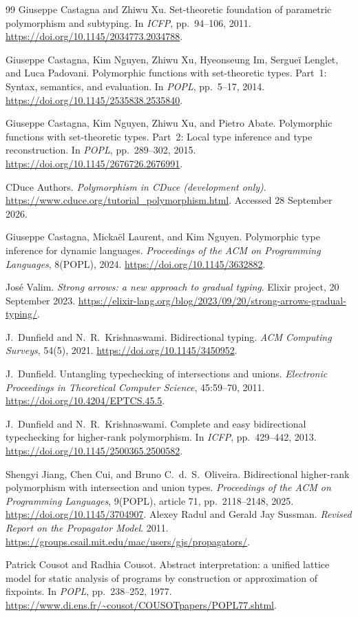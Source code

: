 \documentclass[10pt,a4paper]{article}
\theoremstyle{remark}
\begin{document}
\begin{thebibliography}{99}
Giuseppe Castagna and Zhiwu Xu.
Set-theoretic foundation of parametric polymorphism and subtyping.
In \emph{ICFP}, pp.~94--106, 2011.
\url{https://doi.org/10.1145/2034773.2034788}.

Giuseppe Castagna, Kim Nguyen, Zhiwu Xu, Hyeonseung Im, Sergue\"i Lenglet,
and Luca Padovani.
Polymorphic functions with set-theoretic types. Part~1: Syntax, semantics,
and evaluation. In \emph{POPL}, pp.~5--17, 2014.
\url{https://doi.org/10.1145/2535838.2535840}.

Giuseppe Castagna, Kim Nguyen, Zhiwu Xu, and Pietro Abate.
Polymorphic functions with set-theoretic types. Part~2: Local type inference
and type reconstruction. In \emph{POPL}, pp.~289--302, 2015.
\url{https://doi.org/10.1145/2676726.2676991}.

CDuce Authors. \emph{Polymorphism in CDuce (development only)}.
\url{https://www.cduce.org/tutorial_polymorphism.html}.
Accessed 28 September 2026.

Giuseppe Castagna, Micka\"el Laurent, and Kim Nguyen.
Polymorphic type inference for dynamic languages.
\emph{Proceedings of the ACM on Programming Languages}, 8(POPL), 2024.
\url{https://doi.org/10.1145/3632882}.

Jos\'e Valim. \emph{Strong arrows: a new approach to gradual typing}.
Elixir project, 20 September 2023.
\url{https://elixir-lang.org/blog/2023/09/20/strong-arrows-gradual-typing/}.

J.~Dunfield and N.~R.~Krishnaswami. Bidirectional typing.
\emph{ACM Computing Surveys}, 54(5), 2021.
\url{https://doi.org/10.1145/3450952}.

J.~Dunfield. Untangling typechecking of intersections and unions.
\emph{Electronic Proceedings in Theoretical Computer Science}, 45:59--70, 2011.
\url{https://doi.org/10.4204/EPTCS.45.5}.

J.~Dunfield and N.~R.~Krishnaswami.
Complete and easy bidirectional typechecking for higher-rank polymorphism.
In \emph{ICFP}, pp.~429--442, 2013.
\url{https://doi.org/10.1145/2500365.2500582}.

Shengyi Jiang, Chen Cui, and Bruno C.~d.~S.~Oliveira.
Bidirectional higher-rank polymorphism with intersection and union types.
\emph{Proceedings of the ACM on Programming Languages}, 9(POPL),
article 71, pp.~2118--2148, 2025.
\url{https://doi.org/10.1145/3704907}.
Alexey Radul and Gerald Jay Sussman.
\emph{Revised Report on the Propagator Model}. 2011.
\url{https://groups.csail.mit.edu/mac/users/gjs/propagators/}.

Patrick Cousot and Radhia Cousot.
Abstract interpretation: a unified lattice model for static analysis of programs
by construction or approximation of fixpoints.
In \emph{POPL}, pp.~238--252, 1977.
\url{https://www.di.ens.fr/~cousot/COUSOTpapers/POPL77.shtml}.

\end{thebibliography}
\end{document}

